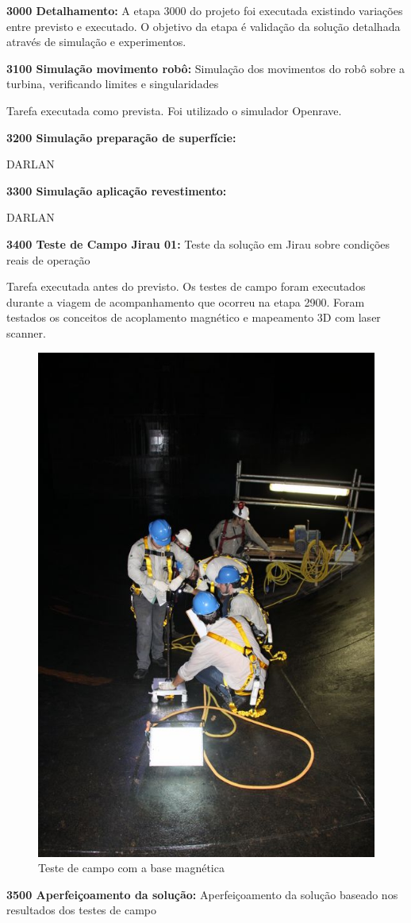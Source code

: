 \textbf{3000 Detalhamento:} A etapa 3000 do projeto foi executada existindo
variações entre previsto e executado. O objetivo da etapa é validação da solução
detalhada através de simulação e experimentos.

\textbf{3100 Simulação movimento robô:} 
Simulação dos movimentos do robô sobre a turbina, verificando limites e singularidades

Tarefa executada como prevista. Foi utilizado o simulador Openrave.  

\textbf{3200 Simulação preparação de superfície:}

DARLAN 

\textbf{3300 Simulação aplicação revestimento:}

DARLAN 

\textbf{3400 Teste de Campo Jirau 01:} Teste da solução  em Jirau sobre
condições reais de operação

Tarefa executada antes do previsto. Os testes de campo foram executados durante
a viagem de acompanhamento que ocorreu na etapa 2900. Foram testados os
conceitos de acoplamento magnético e mapeamento 3D com laser scanner.

\begin{figure}\centering
\includegraphics[width=0.6\columnwidth]{figs/base}
\caption{Teste de campo com a base  magnética}
\end{figure}

\textbf{3500 Aperfeiçoamento da solução:}
Aperfeiçoamento da solução baseado nos resultados dos testes de campo 

